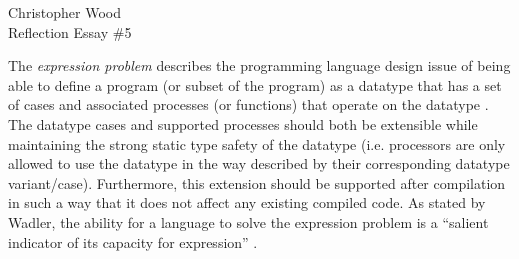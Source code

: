 \documentclass[12pt,letterpaper]{article}
\begin{document}
\begin{center}
Christopher Wood \\
Reflection Essay \#5 \\
\end{center}

\begin{comment}
What is the "expression problem"?
Can you suggest a realistic example of where one might encounter the expression problem is a software development project?
Is this a good "programming-languages problem"? That is, do you think that a programming language that has a "good" solution to the expression problem is "better" than a programming language that has a "bad" solution or no solution?
Can you suggest another "programming-languages problem"? That is, can you suggest a programming or software development task that you think would allow you to identify "good" (e.g., "powerful") languages from "bad" (e.g., "weak") languages.
\end{comment}

The \emph{expression problem} describes the programming language design issue of 
being able to define a program (or subset of the program) 
as a datatype that has a set of cases and associated processes (or functions) 
that operate on the datatype \cite{zenger2004independently}.
The datatype cases and supported processes should both be extensible while maintaining the strong
static type safety of the datatype (i.e. processors are only allowed to use the datatype in the way
described by their corresponding datatype variant/case). Furthermore, this extension should be 
supported after compilation in such a way that it does not affect any existing compiled code. 
As stated by Wadler, the ability for a language to solve the expression problem is a ``salient
indicator of its capacity for expression'' \cite{wadler1998expression}. 
\end{document}
